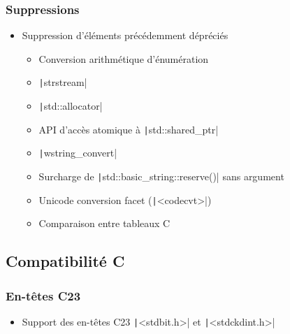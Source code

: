 \documentclass[C++.tex]{subfiles}
\begin{document}
\begin{frame}[fragile]
	\frametitle{Suppressions}
	\begin{itemize}
		\item Suppression d'éléments précédemment dépréciés
		\begin{itemize}
			\item Conversion arithmétique d'énumération
			\item \texttt|strstream|
			\item \texttt|std::allocator|
			\item API d'accès atomique à \texttt|std::shared_ptr|
			\item \texttt|wstring_convert|
			\item Surcharge de \texttt|std::basic_string::reserve()| sans argument
			\item Unicode conversion facet (\texttt|<codecvt>|)
			\item Comparaison entre tableaux C
		\end{itemize}
	\end{itemize}

\end{frame}

\subsection*{Compatibilité C}
\begin{frame}[fragile]
	\frametitle{En-têtes C23}
	\begin{itemize}
		\item Support des en-têtes C23 \texttt|<stdbit.h>| et \texttt|<stdckdint.h>|
	\end{itemize}

\end{frame}
\end{document}
